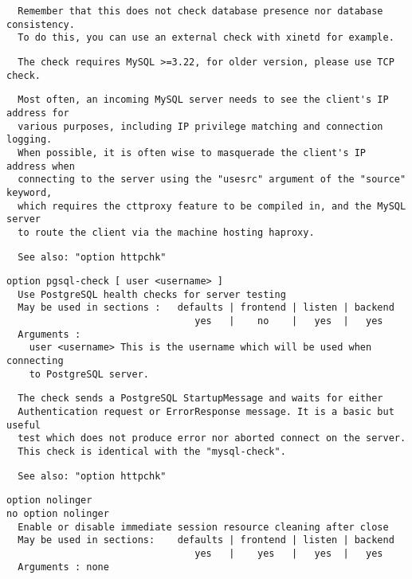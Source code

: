\begin{verbatim}
  Remember that this does not check database presence nor database consistency.
  To do this, you can use an external check with xinetd for example.
\end{verbatim}

\begin{verbatim}
  The check requires MySQL >=3.22, for older version, please use TCP check.
\end{verbatim}

\begin{verbatim}
  Most often, an incoming MySQL server needs to see the client's IP address for
  various purposes, including IP privilege matching and connection logging.
  When possible, it is often wise to masquerade the client's IP address when
  connecting to the server using the "usesrc" argument of the "source" keyword,
  which requires the cttproxy feature to be compiled in, and the MySQL server
  to route the client via the machine hosting haproxy.
\end{verbatim}

\begin{verbatim}
  See also: "option httpchk"
\end{verbatim}

\begin{verbatim}
option pgsql-check [ user <username> ]
  Use PostgreSQL health checks for server testing
  May be used in sections :   defaults | frontend | listen | backend
                                 yes   |    no    |   yes  |   yes
  Arguments :
    user <username> This is the username which will be used when connecting
    to PostgreSQL server.
\end{verbatim}

\begin{verbatim}
  The check sends a PostgreSQL StartupMessage and waits for either
  Authentication request or ErrorResponse message. It is a basic but useful
  test which does not produce error nor aborted connect on the server.
  This check is identical with the "mysql-check".
\end{verbatim}

\begin{verbatim}
  See also: "option httpchk"
\end{verbatim}

\begin{verbatim}
option nolinger
no option nolinger
  Enable or disable immediate session resource cleaning after close
  May be used in sections:    defaults | frontend | listen | backend
                                 yes   |    yes   |   yes  |   yes
  Arguments : none
\end{verbatim}

